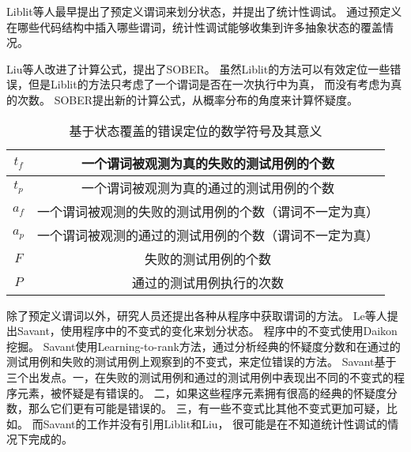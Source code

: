 Liblit等人最早提出了预定义谓词来划分状态\parencite{Liblit2005Scalable}，并提出了统计性调试。
通过预定义在哪些代码结构中插入哪些谓词，统计性调试能够收集到许多抽象状态的覆盖情况。

Liu等人改进了计算公式，提出了SOBER\parencite{Liu2006Statistical}。
虽然Liblit的方法可以有效定位一些错误，但是Liblit的方法只考虑了一个谓词是否在一次执行中为真，
而没有考虑为真的次数。
SOBER提出新的计算公式，从概率分布的角度来计算怀疑度。

\begin{table}
\centering
\begin{tabular}{|c|c|}
\hline
$t_f$ & 一个谓词被观测为真的失败的测试用例的个数 \\
\hline
$t_p$ & 一个谓词被观测为真的通过的测试用例的个数 \\
\hline
$a_f$ & 一个谓词被观测的失败的测试用例的个数（谓词不一定为真）\\
\hline
$a_p$ & 一个谓词被观测的通过的测试用例的个数（谓词不一定为真）\\
\hline
$F$ & 失败的测试用例的个数 \\
\hline
$P$ & 通过的测试用例执行的次数 \\
\hline
\end{tabular}
\caption{基于状态覆盖的错误定位的数学符号及其意义}
\label{state_symbol}
\end{table}

除了预定义谓词以外，研究人员还提出各种从程序中获取谓词的方法。
Le等人提出Savant\parencite{Le2016A}，使用程序中的不变式的变化来划分状态。
程序中的不变式使用Daikon\parencite{Ernst2007The}挖掘。
Savant使用Learning-to-rank方法，通过分析经典的怀疑度分数和在通过的测试用例和失败的测试用例上观察到的不变式，来定位错误的方法。
Savant基于三个出发点。一，在失败的测试用例和通过的测试用例中表现出不同的不变式的程序元素，被怀疑是有错误的。
二，如果这些程序元素拥有很高的经典的怀疑度分数，那么它们更有可能是错误的。
三，有一些不变式比其他不变式更加可疑，比如。
而Savant的工作并没有引用Liblit\parencite{Liblit2005Scalable}和Liu\parencite{Liu2006Statistical}，
很可能是在不知道统计性调试的情况下完成的。

